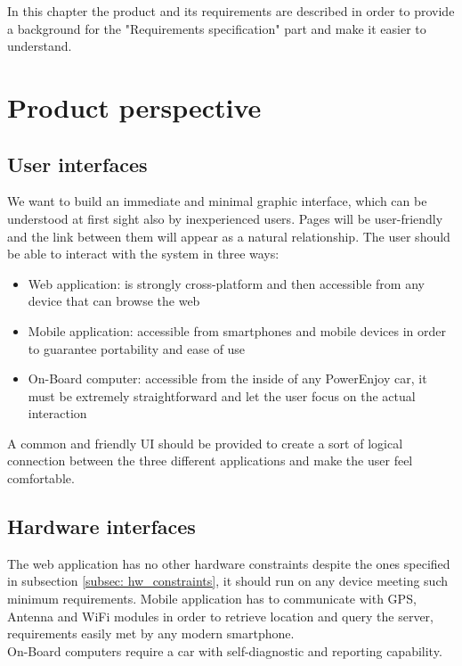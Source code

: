 In this chapter the product and its requirements are described in order to provide a background for the "Requirements specification" part and make it easier to understand.

\section{Product perspective}


\subsection{User interfaces} %
\label{subsec:user_interfaces}
We want to build an immediate and minimal graphic interface, which can be understood at first sight also by inexperienced users. Pages will be user-friendly and the link between them will appear as a natural relationship.
The user should be able to interact with the system in three ways:
\begin{itemize}
	\item{Web application}: is strongly cross-platform and then accessible from any device that can browse the web
	\item{Mobile application}: accessible from smartphones and mobile devices in order to guarantee portability and ease of use
	\item{On-Board computer}: accessible from the inside of any PowerEnjoy car, it must be extremely straightforward and let the user focus on the actual interaction
\end{itemize}
A common and friendly UI should be provided to create a sort of logical connection between the three different applications and make the user feel comfortable. 

\subsection{Hardware interfaces}
The web application has no other hardware constraints despite the ones specified in subsection \ref{subsec: hw_constraints}, it should run on any device meeting such minimum requirements. Mobile application has to communicate with GPS, Antenna and WiFi modules in order to retrieve location and query the server, requirements easily met by any modern smartphone.
\\On-Board computers require a car with self-diagnostic and reporting capability.


